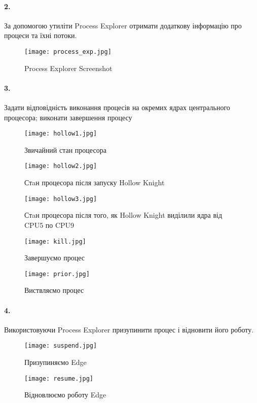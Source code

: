 \documentclass[12pt]{extarticle}
\begin{document}
\paragraph{2.}
За допомогою утиліти Process Explorer отримати додаткову інформацію
про процеси та їхні потоки.

\begin{figure}[H]
    \centering
    \texttt{[image: process\_exp.jpg]}
    \caption{Process Explorer Screenshot}
\end{figure}

\paragraph{3.}
Задати
відповідність виконання процесів на окремих ядрах центрального процесора;
виконати завершення процесу

\begin{figure}[H]
    \centering
    \texttt{[image: hollow1.jpg]}
    \caption{Звичайний стан процесора}
\end{figure}
\begin{figure}[H]
    \centering
    \texttt{[image: hollow2.jpg]}
    \caption{Стaн процесора після запуску Hollow Knight}
\end{figure}
\begin{figure}[H]
    \centering
    \texttt{[image: hollow3.jpg]}
    \caption{Стaн процесора після того, 
        як Hollow Knight виділили ядра від CPU5 по CPU9}
\end{figure}
\begin{figure}[H]
    \centering
    \texttt{[image: kill.jpg]}
    \caption{Завершуємо процес}
\end{figure}

\begin{figure}[H]
    \centering
    \texttt{[image: prior.jpg]}
    \caption{Виствляємо процес}
\end{figure}

\paragraph{4.}
Використовуючи Process Explorer призупинити процес і відновити його
роботу.
\begin{figure}[H]
    \centering
    \texttt{[image: suspend.jpg]}
    \caption{Призупиняємо Edge}
\end{figure}
\begin{figure}[H]
    \centering
    \texttt{[image: resume.jpg]}
    \caption{Відновлюємо роботу Edge}
\end{figure}
\end{document}
